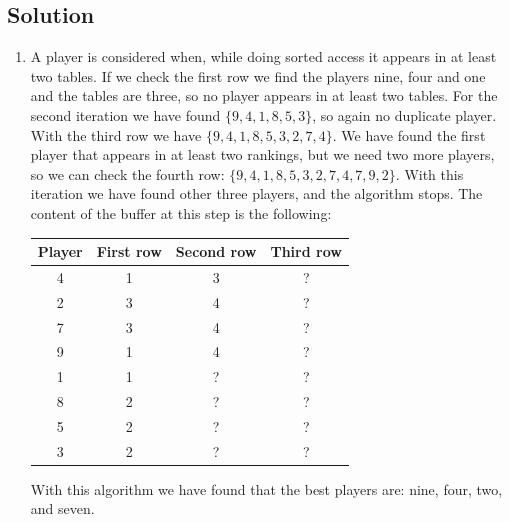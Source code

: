 \subsection*{Solution}
\begin{enumerate}
    \item A player is considered when, while doing sorted access it appears in at least two tables. 
        If we check the first row we find the  players nine, four and one and the tables are three, so no player appears in at least two tables. 
        For the second iteration we have found $\{9,4,1,8,5,3\}$, so again no duplicate player. 
        With the third row we have $\{9,4,1,8,5,3,2,7,4\}$. We have found the first player that appears in at least two rankings, but we need two more players, so we can check the fourth row: $\{9,4,1,8,5,3,2,7,4,7,9,2\}$. 
        With this iteration we have found other three players, and the algorithm stops.
        The content of the buffer at this step is the following: 
        \begin{table}[H]
            \centering
            \begin{tabular}{|c|ccc|}
            \hline
            \textbf{Player} & \textbf{First row} & \textbf{Second row} & \textbf{Third row} \\ \hline
            4               & 1                  & 3                   & ?                  \\
            2               & 3                  & 4                   & ?                  \\
            7               & 3                  & 4                   & ?                  \\ 
            9               & 1                  & 4                   & ?                  \\
            1               & 1                  & ?                   & ?                  \\
            8               & 2                  & ?                   & ?                  \\
            5               & 2                  & ?                   & ?                  \\
            3               & 2                  & ?                   & ?                  \\ \hline
            \end{tabular}
        \end{table}
        With this algorithm we have found that the best players are: nine, four, two, and seven. 

\end{enumerate}
